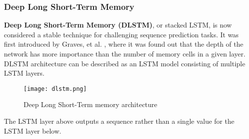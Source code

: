 \subsubsection{Deep Long Short-Term Memory}

\textbf{Deep Long Short-Term Memory (DLSTM)}, or stacked LSTM, is now considered a stable technique for challenging sequence prediction tasks. It was first introduced by Graves, et al. \cite{gravesDLSTM}, where it was found out that the depth of the network has more importance than the number of memory cells in a given layer. DLSTM architecture can be described as an LSTM model consisting of multiple LSTM layers.

\begin{figure}[H]
	\centering
    \texttt{[image: dlstm.png]}
	\caption{Deep Long Short-Term memory architecture \cite{brownleeDLSTM}}
	\label{fig:dlstm}
\end{figure}

The LSTM layer above outputs a sequence rather than a single value for the LSTM layer below. \cite{brownleeDLSTM}

